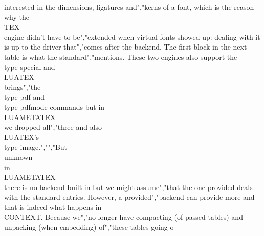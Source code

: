 interested in the dimensions, ligatures and","kerns of a font, which is the reason why the \\TEX\\ engine didn't have to be","extended when virtual fonts showed up: dealing with it is up to the driver that","comes after the backend. The first block in the next table is what the standard","mentions. These two engines also support the \\type {special} and \\LUATEX\\ brings","the \\type {pdf} and \\type {pdfmode} commands but in \\LUAMETATEX\\ we dropped all","three and also \\LUATEX's \\type {image}.","","But \\unknown\\ in \\LUAMETATEX\\ there is no backend built in but we might assume","that the one provided deals with the standard entries. However, a provided","backend can provide more and that is indeed what happens in \\CONTEXT. Because we","no longer have compacting (of passed tables) and unpacking (when embedding) of","these tables going o